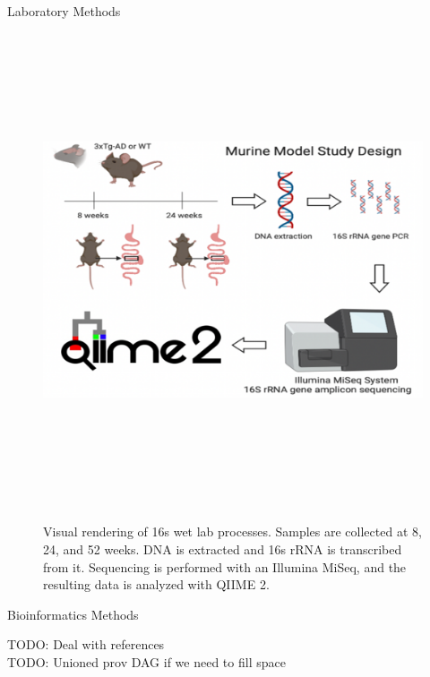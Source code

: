 \documentclass[final]{beamer}
\newlength{\colwidth}
\begin{document}
\begin{frame}[t]
\begin{columns}[t]
\begin{column}{\colwidth}
\begin{block}{Laboratory Methods}
  \begin{figure}[tph!]
    {\includegraphics[height=14cm]{assets/16s_lab_methods}}
    \caption{Visual rendering of 16s wet lab processes. Samples are collected at 8, 24, and 52 weeks. DNA is extracted and 16s rRNA is transcribed from it. Sequencing is performed with an Illumina MiSeq, and the resulting data is analyzed with QIIME 2.}
    \label{fig:16sMethods}
  \end{figure}

  \end{block}

  \begin{block}{Bioinformatics Methods}

    TODO: Deal with references \\
    TODO: Unioned prov DAG if we need to fill space


\end{block}
\end{column}
\end{columns}
\end{frame}
\end{document}
